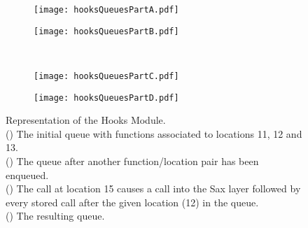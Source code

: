 \documentclass[12pt]{report}
\begin{document}
\begin{figure}
\begin{center}
\begin{subfigure}[t]{.4\linewidth}
	\caption{}
	\label{hooksQueuesA}
	\texttt{[image: hooksQueuesPartA.pdf]}
\end{subfigure}
\begin{subfigure}[t]{.4\linewidth}
	\caption{}
	\label{hooksQueuesB}
	\texttt{[image: hooksQueuesPartB.pdf]}
\end{subfigure} \\
\vspace{4mm}
\begin{subfigure}[t]{.4\linewidth}
	\caption{}
	\label{hooksQueuesC}
	\texttt{[image: hooksQueuesPartC.pdf]}
\end{subfigure}
\begin{subfigure}[t]{.4\linewidth}
	\caption{}
	\label{hooksQueuesD}
	\texttt{[image: hooksQueuesPartD.pdf]}
\end{subfigure}
\end{center}
\caption[Representation of the Hooks Module]{Representation of the Hooks Module. \\() The initial queue with functions associated to locations 11, 12 and 13. \\() The queue after another function/location pair has been enqueued. \\ () The call at location 15 causes a call into the Sax layer followed by every stored call after the given location (12) in the queue. \\ () The resulting queue.}
\label{hooksQueues}
\end{figure}
\end{document}
